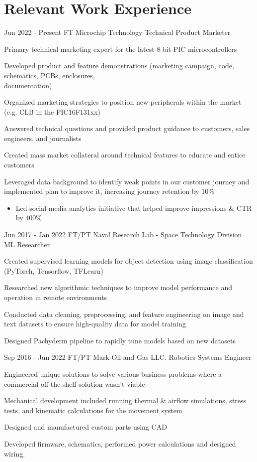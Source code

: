 \documentclass[
	12pt, %
]{FreemanCV}
\begin{document}
\section{Relevant Work Experience}

\jobentry
	{Jun 2022 - Present} %
	{FT} %
	{Microchip Technology} %
	{Technical Product Marketer} %
	{ %
		\item Primary technical marketing expert for the latest 8-bit PIC microcontrollers
		\item Developed product and feature demonstrations (marketing campaign, code, schematics, PCBs, enclosures,\\documentation)
		\item Organized marketing strategies to position new peripherals within the market (e.g. CLB in the PIC16F131xx)
		\item Answered technical questions and provided product guidance to customers, sales engineers, and journalists
		\item Created mass market collateral around technical features to educate and entice customers
		\item Leveraged data background to identify weak points in our customer journey and implemented plan to improve it, increasing journey retention by 10\%
		\begin{itemize}[topsep=-10pt]
		\item Led social-media analytics initiative that helped improve impressions \& CTR by 400\%
		\end{itemize}
	} 


\jobentry
	{Jun 2017 - Jan 2022} %
	{FT/PT} %
	{Naval Research Lab - Space Technology Division} %
	{ML Researcher} %
	{ %
		\item Created supervised learning models for object detection using image classification (PyTorch, Tensorflow, TFLearn)
		\item Researched new algorithmic techniques to improve model performance and operation in remote environments
		\item Conducted data cleaning, preprocessing, and feature engineering on image and text datasets to ensure high-quality data for model training
		\item Designed Pachyderm pipeline to rapidly tune models based on new datasets
	} 
	

	
\jobentry
{Sep 2016 - Jun 2022} %
{FT/PT} %
{Mark Oil and Gas LLC.} %
{Robotics Systems Engineer} %
{ %
	\item Engineered unique solutions to solve various business problems where a commercial off-the-shelf solution wasn't viable
	\item Mechanical development included running thermal \& airflow simulations, stress tests, and kinematic calculations for the movement system
	\item Designed and manufactured custom parts using CAD
	\item Developed firmware, schematics, performed power calculations and designed wiring.
}
\end{document}
